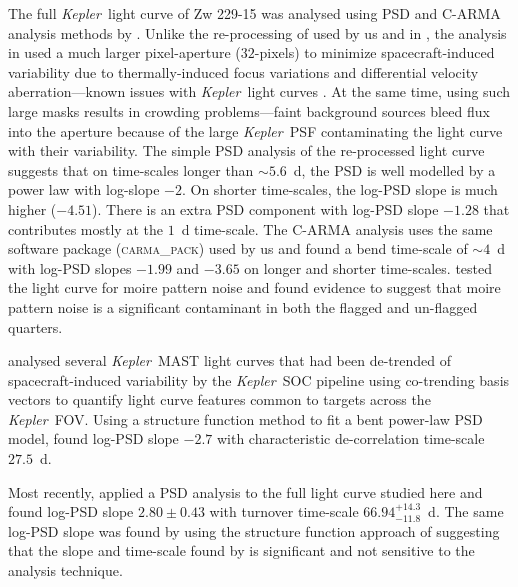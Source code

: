 \documentclass[a4paper,fleqn,usenatbib]{mnras}
\newcommand{\Kepler}{\textit{Kepler~}}
\begin{document}
The full \Kepler light curve of Zw 229-15 was analysed using PSD and C-ARMA analysis methods by \citet{Edelson14}. Unlike the re-processing of \citet{CariniWilliamsAAS} used by us and in \citet{Kasliwal15b}, the analysis in \citet{Edelson14} used a much larger pixel-aperture ($32$-pixels) to minimize spacecraft-induced variability due to thermally-induced focus variations and differential velocity aberration---known issues with \Kepler light curves \citep{Kinemuchi12}. At the same time, using such large masks results in crowding problems---faint background sources bleed flux into the aperture because of the large \Kepler PSF contaminating the light curve with their variability. The simple PSD analysis of the re-processed light curve suggests that on time-scales longer than $\sim 5.6$~d, the PSD is well modelled by a power law with log-slope $-2$. On shorter time-scales, the log-PSD slope is much higher ($-4.51$). There is an extra PSD component with log-PSD slope $-1.28$ that contributes mostly at the $1$~d time-scale. The C-ARMA analysis uses the same software package (\textsc{carma\_pack}) used by us and found a bend time-scale of $\sim 4$~d with log-PSD slopes $-1.99$ and $-3.65$ on longer and shorter time-scales. \citet{Edelson14} tested the light curve for moire pattern noise and found evidence to suggest that moire pattern noise is a significant contaminant in both the flagged and un-flagged quarters.

\citet{Kasliwal15} analysed several \Kepler MAST light curves that had been de-trended of spacecraft-induced variability by the \Kepler SOC pipeline using co-trending basis vectors to quantify light curve features common to targets across the \Kepler FOV. Using a structure function method to fit a bent power-law PSD model, \citet{Kasliwal15} found log-PSD slope $-2.7$ with characteristic de-correlation time-scale $27.5$~d.

Most recently, \citet{CariniWilliamsAAS} applied a PSD analysis to the full light curve studied here and found log-PSD slope $2.80 \pm 0.43$ with turnover time-scale $66.94^{+14.3}_{-11.8}$~d. The same log-PSD slope was found by \citet{Kasliwal15b} using the structure function approach of \citet{Kasliwal15} suggesting that the slope and time-scale found by \citet{CariniWilliamsAAS} is significant and not sensitive to the analysis technique.
\end{document}
